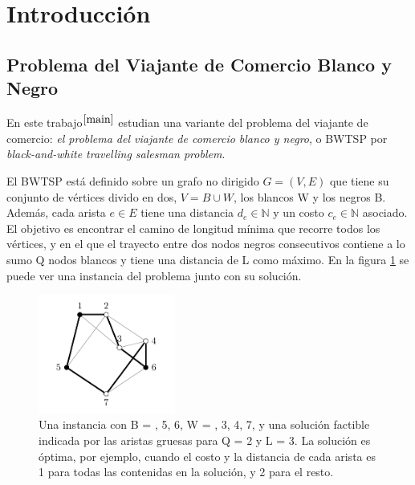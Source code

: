 \documentclass[10pt, a4paper]{article}
\theoremstyle{definition}
\begin{document}




\maketitle

\tableofcontents

\newpage

\section{Introducción}

\subsection{Problema del Viajante de Comercio Blanco y Negro}
En este trabajo$^{\cite{main}}$ estudian una variante del problema del viajante de comercio: \textit{el problema del viajante de comercio blanco y negro}, o BWTSP por \textit{black-and-white travelling salesman problem}.

El BWTSP está definido sobre un grafo no dirigido $G = (V,E)$ que tiene su conjunto de vértices divido en dos, $V = B \cup W$, los blancos W y los negros B. Además, cada arista $e \in E$ tiene una distancia $d_e \in \mathds{N}$ y un costo $c_e \in \mathds{N}$ asociado. El objetivo es encontrar el camino de longitud mínima que recorre todos los vértices, y en el que el trayecto entre dos nodos negros consecutivos contiene a lo sumo Q nodos blancos y tiene una distancia de L como máximo. En la figura \ref{fig:ejemplo_0} se puede ver una instancia del problema junto con su solución.

\begin{figure}[H]
    \centering
    \includegraphics[width=0.4\textwidth]{ejemplo_0.png}
    \caption{Una instancia con B = , 5, 6\textbraceright, W = , 3, 4, 7\textbraceright, y una solución factible indicada por las aristas gruesas para Q = 2 y L = 3. La solución es óptima, por ejemplo, cuando el costo y la distancia de cada arista es 1 para todas las contenidas en la solución, y 2 para el resto.}
    \label{fig:ejemplo_0}
\end{figure}
\end{document}
